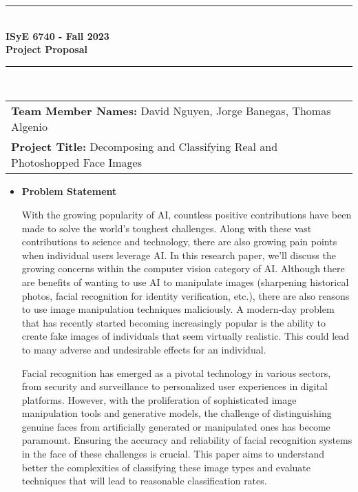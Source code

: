 \documentclass{article}
\begin{document}
\begin{titlepage}
	\clearpage\thispagestyle{empty}
	\centering
	\vspace{1cm}
		
	\rule{\linewidth}{1mm} \\[0.5cm]
	{ \Large \bfseries ISyE 6740 - Fall 2023\\[0.2cm]
		Project Proposal}\\[0.5cm]
	\rule{\linewidth}{1mm} \\[1cm]
 
		\begin{tabular}{l p{5cm}}
		\textbf{Team Member Names:} David Nguyen, Jorge Banegas, Thomas Algenio &  \\[10pt]
		\textbf{Project Title:} Decomposing and Classifying Real and Photoshopped Face Images &  \\[10pt]
		\end{tabular} 

        \begin{itemize}
            \item[] \textbf{Problem Statement}
        
            With the growing popularity of AI, countless positive contributions have been made to solve the world's toughest challenges. Along with these vast contributions to science and technology, there are also growing pain points when individual users leverage AI. In this research paper, we'll discuss the growing concerns within the computer vision category of AI. Although there are benefits of wanting to use AI to manipulate images (sharpening historical photos, facial recognition for identity verification, etc.), there are also reasons to use image manipulation techniques maliciously. A modern-day problem that has recently started becoming increasingly popular is the ability to create fake images of individuals that seem virtually realistic. This could lead to many adverse and undesirable effects for an individual. 
            
            Facial recognition has emerged as a pivotal technology in various sectors, from security and surveillance to personalized user experiences in digital platforms. However, with the proliferation of sophisticated image manipulation tools and generative models, the challenge of distinguishing genuine faces from artificially generated or manipulated ones has become paramount. Ensuring the accuracy and reliability of facial recognition systems in the face of these challenges is crucial. This paper aims to understand better the complexities of classifying these image types and evaluate techniques that will lead to reasonable classification rates. 
            

\end{itemize}
\end{titlepage}
\end{document}
